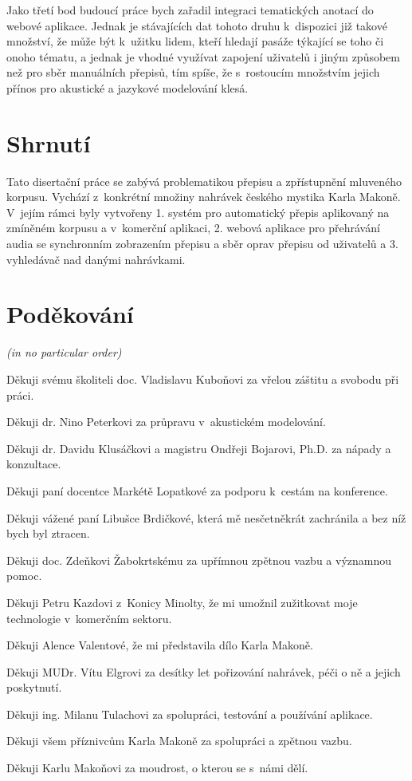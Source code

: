 Jako třetí bod budoucí práce bych zařadil integraci tematických anotací do
webové aplikace. Jednak je stávajících dat tohoto druhu k~dispozici již takové
množství, že může být k~užitku lidem, kteří hledají pasáže týkající se toho či
onoho tématu, a jednak je vhodné využívat zapojení uživatelů i jiným způsobem
než pro sběr manuálních přepisů, tím spíše, že s~rostoucím množstvím jejich
přínos pro akustické a jazykové modelování klesá.

\section{Shrnutí}

Tato disertační práce se zabývá problematikou přepisu a zpřístupnění mluveného
korpusu. Vychází z~konkrétní množiny nahrávek českého mystika Karla Makoně.
V~jejím rámci byly vytvořeny 1. systém pro automatický přepis aplikovaný na zmíněném
korpusu a v~komerční aplikaci, 2. webová aplikace pro přehrávání audia se
synchronním zobrazením přepisu a sběr oprav přepisu od uživatelů a 3.
vyhledávač nad danými nahrávkami.

\section{Poděkování}

{\em (in no particular order)}

Děkuji svému školiteli doc. Vladislavu Kuboňovi za vřelou záštitu a svobodu při
práci.

Děkuji dr. Nino Peterkovi za průpravu v~akustickém modelování.

Děkuji dr. Davidu Klusáčkovi a magistru Ondřeji Bojarovi, Ph.D. za nápady a konzultace.

Děkuji paní docentce Markétě Lopatkové za podporu k~cestám na konference.

Děkuji vážené paní Libušce Brdičkové, která mě nesčetněkrát zachránila a bez níž
bych byl ztracen.

Děkuji doc. Zdeňkovi Žabokrtskému za upřímnou zpětnou vazbu a významnou pomoc.

Děkuji Petru Kazdovi z~Konicy Minolty, že mi umožnil zužitkovat moje
technologie v~komerčním sektoru.

Děkuji Alence Valentové, že mi představila dílo Karla Makoně.

Děkuji MUDr. Vítu Elgrovi za desítky let pořizování nahrávek, péči o ně a jejich
poskytnutí.

Děkuji ing. Milanu Tulachovi za spolupráci, testování a používání aplikace.

Děkuji všem příznivcům Karla Makoně za spolupráci a zpětnou vazbu.

Děkuji Karlu Makoňovi za moudrost, o kterou se s~námi dělí.
